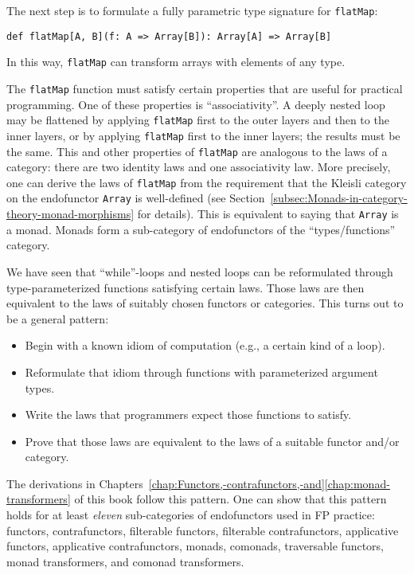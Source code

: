 The next step is to formulate a fully parametric type signature for
\lstinline!flatMap!:
\begin{lstlisting}
def flatMap[A, B](f: A => Array[B]): Array[A] => Array[B]
\end{lstlisting}
In this way, \lstinline!flatMap! can transform arrays with elements
of any type.

The \lstinline!flatMap! function must satisfy certain properties
that are useful for practical programming. One of these properties
is \textsf{``}associativity\textsf{''}. A deeply nested loop may be flattened by applying
\lstinline!flatMap! first to the outer layers and then to the inner
layers, or by applying \lstinline!flatMap! first to the inner layers;
the results must be the same. This and other properties of \lstinline!flatMap!
are analogous to the laws of a category: there are two identity laws
and one associativity law. More precisely, one can derive the laws
of \lstinline!flatMap! from the requirement that the Kleisli category
on the endofunctor \lstinline!Array! is well-defined (see Section~\ref{subsec:Monads-in-category-theory-monad-morphisms}
for details). This is equivalent to saying that \lstinline!Array!
is a monad. Monads form a sub-category of endofunctors of the \textsf{``}types/functions\textsf{''}
category.


We have seen that \textsf{``}while\textsf{''}-loops and nested loops can be reformulated
through type-parameterized functions satisfying certain laws. Those
laws are then equivalent to the laws of suitably chosen functors or
categories. This turns out to be a general pattern:
\begin{itemize}
\item Begin with a known idiom of computation (e.g., a certain kind of a
loop).
\item Reformulate that idiom through functions with parameterized argument
types.
\item Write the laws that programmers expect those functions to satisfy.
\item Prove that those laws are equivalent to the laws of a suitable functor
and/or category.
\end{itemize}
The derivations in Chapters~\ref{chap:Functors,-contrafunctors,-and}\textendash \ref{chap:monad-transformers}
of this book follow this pattern. One can show that this pattern holds
for at least \emph{eleven} sub-categories of endofunctors used in
FP practice: functors, contrafunctors, filterable functors, filterable
contrafunctors, applicative functors, applicative contrafunctors,
monads, comonads, traversable functors, monad transformers, and comonad
transformers. 

